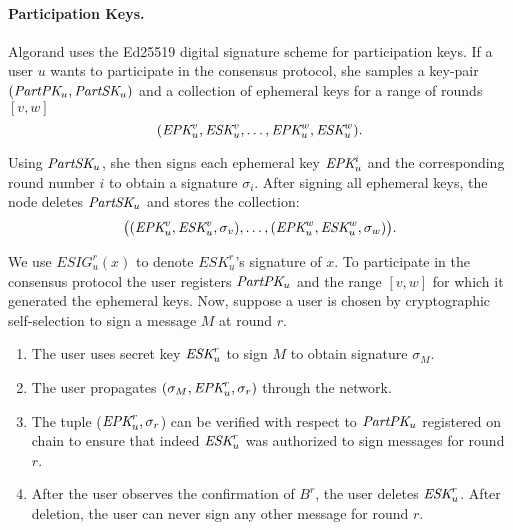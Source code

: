 \documentclass[../main.tex]{subfiles}
\begin{document}
\paragraph{Participation Keys.} 

Algorand uses the Ed25519 digital signature scheme for participation keys. If a user $u$ wants to participate in the consensus protocol, 
she samples a key-pair $(\textit{PartPK}_u, \textit{PartSK}_u)$ and a collection of ephemeral keys for a range of rounds $[v,w]$
\[
(\textit{EPK}_u^v, \textit{ESK}_u^v, \ldots, \textit{EPK}_u^w, \textit{ESK}_u^w).
\]

Using $\textit{PartSK}_u$, she then signs each ephemeral key $\textit{EPK}_u^i$ and the corresponding round number $i$ to obtain a signature $\sigma_i$. 
After signing all ephemeral keys, the node deletes $\textit{PartSK}_u$ and stores the collection: 
\[
\big((\textit{EPK}_u^v, \textit{ESK}_u^v, \sigma_v), \ldots, (\textit{EPK}_u^w, \textit{ESK}_u^w, \sigma_w)\big).
\] 

We use $ESIG_u^r(x)$ to denote $ESK_u^r$'s signature of $x$.
To participate in the consensus protocol the user registers $\textit{PartPK}_u$ and the range $[v,w]$ for which it generated the ephemeral keys. 
Now, suppose a user is chosen by cryptographic self-selection to sign a message $M$ at round $r$. 
\begin{enumerate}
\item The user uses secret key $\textit{ESK}_u^r$ to sign $M$ to obtain signature $\sigma_M$. 
\item The user propagates $(\sigma_M, \textit{EPK}^r_u, \sigma_r)$ through the network.
\item The tuple ($\textit{EPK}^r_u, \sigma_r$) can be verified with respect to $\textit{PartPK}_u$ registered on chain to ensure that indeed $\textit{ESK}^r_u$ was authorized to sign messages for round $r$. 
\item After the user observes the confirmation of $B^r$, the user deletes $\textit{ESK}^r_u$. After deletion, the user can never sign any other message for round $r$. 
\end{enumerate} 
\end{document}

